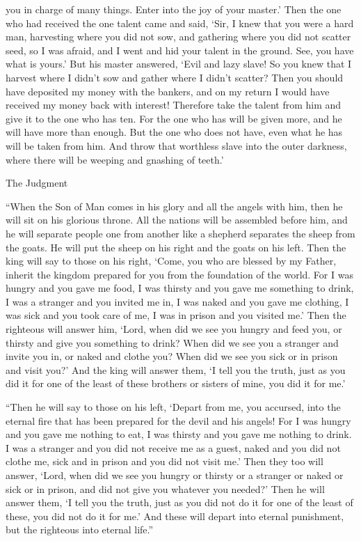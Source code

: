 {you
in charge
of many things.
Enter
into
the joy
of your
master.’
Then the one who had received
the one
talent
came
and said,
‘Sir,
I knew
that
you
were
a hard
man,
harvesting
where
you did
not
sow,
and
gathering
where
you did
not
scatter seed,
so
I was afraid,
and I went
and hid
your
talent
in
the ground.
See,
you have
what is yours.’
But
his
master
answered, ‘Evil
and
lazy
slave! So you knew
that
I harvest
where
I
didn’t
sow
and
gather
where
I
didn’t
scatter?
Then you
should
have deposited
my
money
with the bankers,
and
on my return
I
would
have received
my money
back with
interest!
Therefore
take
the talent
from
him
and
give
it to the one who has
ten.
For
the one who has
will be given
more,
and
he will have more than enough.
But
the one who does
not
have,
even
what
he has
will be taken
from
him.
And
throw
that worthless
slave
into
the outer
darkness,
where there
will be
weeping
and
gnashing
of teeth.’
\par }{\SH The Judgment
\par }{\PP {}“When
the Son
of Man
comes
in
his
glory
and
all
the angels
with
him,
then
he will sit
on
his
glorious
throne.
All
the nations
will be assembled
before
him,
and
he will separate
people
one
from
another
like
a shepherd
separates
the sheep
from
the goats.
He will put
the sheep
on
his
right
and
the goats
on
his left.
Then
the king
will say
to those on
his
right,
‘Come, you
who are blessed
by my
Father,
inherit
the kingdom
prepared
for you
from
the foundation
of the world.
For
I was hungry
and
you gave
me
food,
I was thirsty
and
you gave
me
something to drink,
I was
a stranger
and
you invited
me in,
I was naked
and
you gave
me
clothing,
I was sick
and
you took care
of me,
I was
in
prison
and
you visited
me.’
Then
the righteous
will answer
him, ‘Lord,
when
did we see
you
hungry
and
feed
you, or
thirsty
and
give
you something to drink?
When
did we see
you
a stranger
and
invite
you in, or
naked
and
clothe you?
When
did we see
you
sick
or
in
prison
and
visit
you?’
And
the king
will answer
them, ‘I tell
you
the truth,
just as
you did
it for one
of the least
of these
brothers
or sisters of mine,
you did
it for me.’
\par }{\PP {}“Then
he will say
to those on
his left,
‘Depart
from
me,
you accursed,
into
the eternal
fire
that has been prepared
for the devil
and
his
angels!
For
I was hungry
and
you gave
me
nothing
to eat,
I was thirsty
and
you gave
me
nothing
to drink.
I was
a stranger
and
you did
not
receive
me
as a guest, naked
and
you did
not
clothe
me,
sick
and
in
prison
and
you did
not
visit
me.’
Then
they
too
will answer, ‘Lord,
when
did we see
you
hungry
or
thirsty
or
a stranger
or
naked
or
sick
or
in
prison,
and
did not
give
you whatever
you
needed?’
Then
he will answer
them, ‘I tell
you
the truth,
just as
you did
not
do
it for one
of the least
of these,
you did
not
do
it for me.’
And
these
will depart
into
eternal
punishment,
but
the righteous
into
eternal
life.”

}
